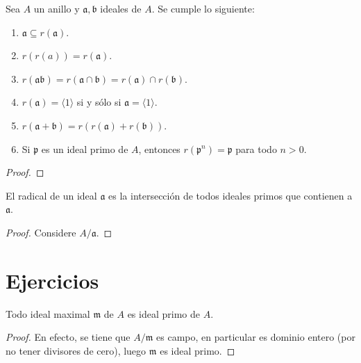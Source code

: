 \documentclass[12pt]{report}
\newcounter{it}
\theoremstyle{largebreak}
\newcommand{\gen}[1]{\ensuremath{\langle#1\rangle}}
\begin{document}
    \begin{excer}
        Sea $A$ un anillo y $\mathfrak{a},\mathfrak{b}$ ideales de $A$. Se cumple lo siguiente:
        \begin{enumerate}[label = \textit{(\arabic*)}]
            \item $\mathfrak{a}\subseteq r(\mathfrak{a})$.
            \item $r(r(a))=r(\mathfrak{a})$.
            \item $r(\mathfrak{a}\mathfrak{b})=r(\mathfrak{a}\cap\mathfrak{b})=r(\mathfrak{a})\cap r(\mathfrak{b})$.
            \item $r(\mathfrak{a})=\gen{1}$ si y sólo si $\mathfrak{a}=\gen{1}$.
            \item $r(\mathfrak{a}+\mathfrak{b})=r(r(\mathfrak{a})+r(\mathfrak{b}))$.
            \item Si $\mathfrak{p}$ es un ideal primo de $A$, entonces $r(\mathfrak{p}^n)=\mathfrak{p}$ para todo $n>0$.
        \end{enumerate}
    \end{excer}

    \begin{proof}
    \end{proof}
    
    \begin{propo}
        El radical de un ideal $\mathfrak{a}$ es la intersección de todos ideales primos que contienen a $\mathfrak{a}$.
    \end{propo}

    \begin{proof}
        Considere $A/\mathfrak{a}$.%
    \end{proof}

    \newpage

    \section{Ejercicios}

    \begin{propo}
        Todo ideal maximal $\mathfrak{m}$ de $A$ es ideal primo de $A$.
    \end{propo}

    \begin{proof}
        En efecto, se tiene que $A/\mathfrak{m}$ es campo, en particular es dominio entero (por no tener divisores de cero), luego $\mathfrak{m}$ es ideal primo.
    \end{proof}
\end{document}
